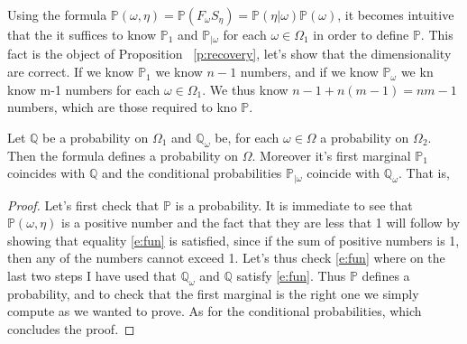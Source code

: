 Using the formula $\mathbb P(\omega,\eta) = \mathbb P(F_\omega S_\eta) = \mathbb P(\eta |\omega)\mathbb P(\omega)$, it becomes intuitive that the it suffices to know $\mathbb P_1$ and $\mathbb P_{|\omega}$ for each $\omega \in \Omega_1$ in order to define $\mathbb P$. This fact is the object of Proposition ~\ref{p:recovery}, let's show that the dimensionality are correct. If we know $\mathbb P_1$ we know $n-1$ numbers, and if we know $\mathbb P_\omega$ we kn know m-1 numbers for each $\omega \in \Omega_1$. We thus know $n-1 + n(m-1) = nm-1$ numbers, which are those required to kno $\mathbb P$.
\begin{proposition}
\label{p:recovery}

Let $\mathbb Q$ be a probability on $\Omega_1$ and $\mathbb Q_\omega$ be, for each $\omega \in\Omega$ a probability on $\Omega_2$. Then the formula
defines a probability on $\Omega$. Moreover it's first marginal $\mathbb P_1$ coincides with $\mathbb Q$ and the conditional probabilities $\mathbb P_{|\omega}$ coincide with $\mathbb Q_\omega$. That is, 
\end{proposition}

\begin{proof}
Let's first check that $\mathbb P$ is a probability. It is immediate to see that $\mathbb P(\omega,\eta)$ is a positive number and the fact that they are less that 1 will follow by showing that equality \eqref{e:fun} is satisfied, since if the sum of positive numbers is 1, then any of the numbers cannot exceed 1. Let's thus check \eqref{e:fun}
where on the last two steps I have used that $\mathbb Q_\omega$ and $\mathbb Q$ satisfy \eqref{e:fun}. Thus $\mathbb P$ defines a probability, and to check that the first marginal is the right one we simply compute 
as we wanted to prove. As for the conditional probabilities,
which concludes the proof. 
    \end{proof}



